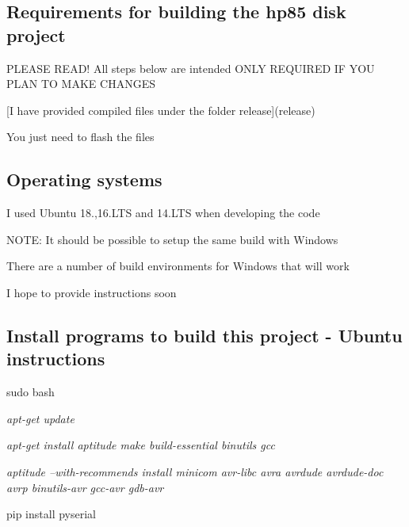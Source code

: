 \subsection*{Requirements for building the hp85 disk project}


\begin{DoxyItemize}
\item P\+L\+E\+A\+SE R\+E\+A\+D! All steps below are intended O\+N\+LY R\+E\+Q\+U\+I\+R\+ED IF Y\+OU P\+L\+AN TO M\+A\+KE C\+H\+A\+N\+G\+ES
\item \mbox{[}I have provided compiled files under the folder release\mbox{]}(release)
\begin{DoxyItemize}
\item You just need to flash the files
\end{DoxyItemize}
\end{DoxyItemize}

\subsection*{Operating systems}


\begin{DoxyItemize}
\item I used Ubuntu 18.,16.\+L\+TS and 14.\+L\+TS when developing the code
\begin{DoxyItemize}
\item N\+O\+TE\+: It should be possible to setup the same build with Windows
\begin{DoxyItemize}
\item There are a number of build environments for Windows that will work
\begin{DoxyItemize}
\item I hope to provide instructions soon
\end{DoxyItemize}
\end{DoxyItemize}
\end{DoxyItemize}
\end{DoxyItemize}

\subsection*{Install programs to build this project -\/ Ubuntu instructions}


\begin{DoxyItemize}
\item sudo bash
\item {\itshape apt-\/get update}
\item {\itshape apt-\/get install aptitude make build-\/essential binutils gcc}
\item {\itshape aptitude --with-\/recommends install minicom avr-\/libc avra avrdude avrdude-\/doc avrp binutils-\/avr gcc-\/avr gdb-\/avr}
\item pip install pyserial
\end{DoxyItemize}

